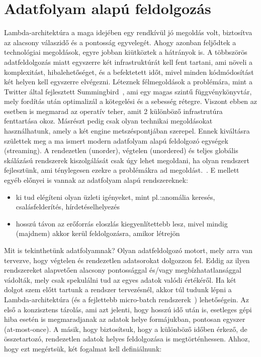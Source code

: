 \documentclass[a4paper,12pt]{article}
\begin{document}
\section{Adatfolyam alapú feldolgozás}
Lambda-architektúra a maga idejében egy rendkívül jó megoldás volt, biztosítva az alacsony válaszidő és a pontosság egyvelegét. Ahogy azonban feljődtek a technológiai megoldások, egyre jobban kiütköztek a hátrányok is. A többszörös adatfeldolgozás miatt egyszerre két infrastruktúrát kell fent tartani, ami növeli a komplexitást, hibalehetőséget, és a befektetett időt, mivel minden kódmódosítást két helyen kell egyszerre elvégezni. Léteznek félmegoldások a problémára, mint a Twitter által fejlesztett Summingbird~\cite{summingbird}, ami egy magas szintű függvénykönyvtár, mely fordítás után optimalizál a kötegelési és a sebesség rétegre. Viszont ebben az esetben is megmarad az operatív teher, amit 2 különböző infrastrutúra fenttartása okoz. Másrészt pedig csak olyan technikai megoldásokat használhatunk, amely a két engine metszéspontjában szerepel. \linebreak
Ennek kiváltásra születtek meg a ma ismert modern adatfolyam alapú feldolgozó egységek (streaming). A rendezetlen (unorder), végtelen (unordered) és teljes globális skálázású rendszerek kiszolgálását csak úgy lehet megoldani, ha olyan rendszert fejlesztünk, ami ténylegesen ezekre a problémákra ad megoldást.~\cite{tyler}. E mellett egyéb előnyei is vannak az adatfolyam alapú rendszereknek: 
\begin{itemize}
\item ki tud elégíteni olyan üzleti igényeket, mint pl.:anomália keresés, csalásfelderítés, hírdetéselhelyezés
\item hosszú távon az erőforrás eloszlás kiegyenlítettebb lesz, mivel mindig (majdnem) akkor kerül feldolgozásra, amikor létrejön
\end{itemize}
Mit is tekinthetünk adatfolyamnak? Olyan adatfeldolgozó motort, mely arra van tervezve, hogy végtelen és rendezetlen adatsorokat dolgozzon fel. Eddig az ilyen rendszereket alapvetően alacsony pontossággal és/vagy megbízhatatlansággal vádolták, mely csak spekulálni tud az egyes adatok valódi értékéről. Ha két dolgot szem előtt tartunk a rendszer tervezésnél, akkor túl tudunk lépni a Lambda-architektúra (és a fejlettebb micro-batch rendszerek~\cite{microbatch}) lehetőségein. Az első a konzisztens tárolás, ami azt jelenti, hogy hosszú idő után is, esetleges gépi hiba esetén is megmaradjanak az adatok helye formájukban, pontosan egyszer (at-most-once). A másik, hogy biztosítsuk, hogy a különböző időben érkező, de összetartozó, rendezetlen adatok helyes feldolgozása is megtörténhessen. Ahhoz, hogy ezt megértsük, két fogalmat kell definiálnunk:
\end{document}

